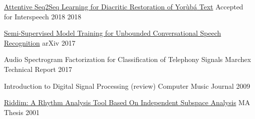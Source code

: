
\begin{cvhonors}

  \cvhonor
    {\href{https://arxiv.org/abs/1804.00832}{Attentive Seq2Seq Learning for Diacritic Restoration of Yor{\`u}b{\'a} Text}} %
    {Accepted for Interspeech 2018} %
    {} %
    {2018} %

  \cvhonor
    {\href{https://arxiv.org/abs/1705.09724}{Semi-Supervised Model Training for Unbounded Conversational Speech Recognition}} %
    {arXiv} %
    {} %
    {2017} %

  \cvhonor
    {Audio Spectrogram Factorization for Classification of Telephony Signals} %
    {Marchex Technical Report} %
    {} %
    {2017} %

  \cvhonor
    {Introduction to Digital Signal Processing (review)} %
    {Computer Music Journal} %
    {} %
    {2009} %
        
  \cvhonor
    {\href{https://arxiv.org/abs/1705.04792}{Riddim: A Rhythm Analysis Tool Based On Independent Subspace Analysis}} %
    {MA Thesis} %
    {} %
    {2001} %
    
\end{cvhonors}
